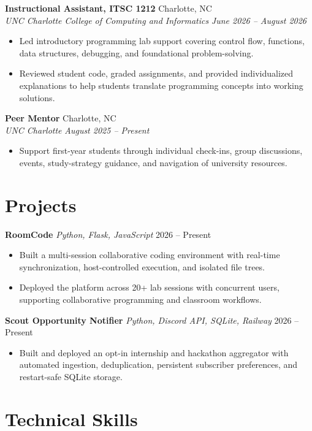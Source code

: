 \documentclass[letterpaper,10pt]{article}
\newcommand{\resumeentry}[4]{
  \noindent\textbf{#1} \hfill #2 \\
  \textit{#3} \hfill \textit{#4}
}
\newcommand{\projectentry}[3]{
  \noindent\textbf{#1} \textbar{} \textit{#2} \hfill #3
}
\begin{document}
\smallskip

\resumeentry
  {Instructional Assistant, ITSC 1212}{Charlotte, NC}
  {UNC Charlotte College of Computing and Informatics}{June 2026 -- August 2026}
\begin{itemize}
  \item Led introductory programming lab support covering control flow, functions, data structures, debugging, and foundational problem-solving.
  \item Reviewed student code, graded assignments, and provided individualized explanations to help students translate programming concepts into working solutions.
\end{itemize}

\smallskip

\resumeentry
  {Peer Mentor}{Charlotte, NC}
  {UNC Charlotte}{August 2025 -- Present}
\begin{itemize}
  \item Support first-year students through individual check-ins, group discussions, events, study-strategy guidance, and navigation of university resources.
\end{itemize}

\section{Projects}

\projectentry
  {RoomCode}
  {Python, Flask, JavaScript}
  {2026 -- Present}
\begin{itemize}
  \item Built a multi-session collaborative coding environment with real-time synchronization, host-controlled execution, and isolated file trees.
  \item Deployed the platform across 20+ lab sessions with concurrent users, supporting collaborative programming and classroom workflows.
\end{itemize}

\smallskip

\projectentry
  {Scout Opportunity Notifier}
  {Python, Discord API, SQLite, Railway}
  {2026 -- Present}
\begin{itemize}
  \item Built and deployed an opt-in internship and hackathon aggregator with automated ingestion, deduplication, persistent subscriber preferences, and restart-safe SQLite storage.
\end{itemize}

\section{Technical Skills}
\end{document}
